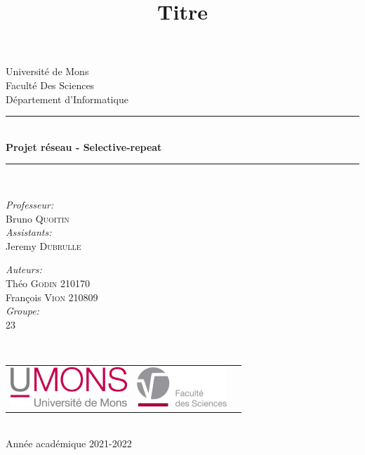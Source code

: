 \documentclass{article}
\title{Titre}
\author{ }
\date{ }
\begin{document}
\begin{titlepage}
	\begin{center}

		{\Large Université de Mons}\\[1ex]
		{\Large Faculté Des Sciences}\\[1ex]
		{\Large Département d'Informatique}\\[1ex]

		\newcommand{\HRule}{\rule{\linewidth}{0.3mm}}
		\HRule \\[0.3cm]
		{ \LARGE \bfseries Projet réseau - Selective-repeat \\[0.3cm]}
		\HRule \\[1.5cm]

		\begin{minipage}[t]{0.45\textwidth}
			\begin{flushleft} \large
				\emph{Professeur:}\\
				Bruno \textsc{Quoitin}\\
				\emph{Assistants:}\\
				Jeremy \textsc{Dubrulle}\\
			\end{flushleft}
		\end{minipage}
		\begin{minipage}[t]{0.45\textwidth}
			\begin{flushright} \large
				\emph{Auteurs:} \\
				Théo \textsc{Godin} 210170 \\
				François \textsc{Vion} 210809 \\
				\emph{Groupe:} \\
				23
			\end{flushright}
		\end{minipage}\\[2ex]

		\vfill

		\begin{center}
			\begin{tabular}[t]{c c c}
				\includegraphics[height=1.5cm]{ressources/logoumons.jpg} &
				\includegraphics[height=1.5cm]{ressources/logofs.jpg} &
			\end{tabular}
		\end{center}~\\

		{\large Année académique 2021-2022}

	\end{center}
\end{titlepage}
\end{document}
